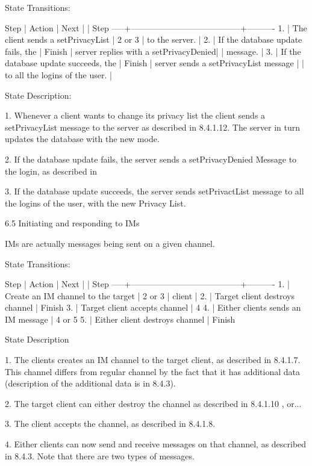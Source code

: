 \documentclass[titlepage,oneside]{book}
\begin{document}
State Transitions:

Step | Action                                |  Next
     |                                       |  Step
-----+---------------------------------------+----------
1.   | The client sends a setPrivacyList     | 2 or 3
     | to the server.                        |
2.   | If the database update fails, the     | Finish
     | server replies with a setPrivacyDenied|
     | message.                              |
3.   | If the database update succeeds, the  | Finish
     | server sends a setPrivacyList message |
     | to all the logins of the user.        |

State Description:

1. Whenever a client wants to change its privacy list the client sends
a setPrivacyList message to the server as described in
8.4.1.12. The server in turn updates the database with the
new mode.

2. If the database update fails, the server sends a setPrivacyDenied
Message to the login, as described in 

3. If the database update succeeds, the server sends setPrivactList
message to all the logins of the user, with the new Privacy List.

6.5 Initiating and responding to IMs

IMs are actually messages being sent on a given channel.

State Transitions:

Step | Action                                |  Next
     |                                       |  Step
-----+---------------------------------------+----------
1.   | Create an IM channel to the target    |  2 or 3
     | client                                |
2.   | Target client destroys channel        |  Finish
3.   | Target client accepts channel         |  4
4.   | Either clients sends an IM message    |  4 or 5
5.   | Either client destroys channel        |  Finish


State Description

1. The clients creates an IM channel to the target client, as described
in 8.4.1.7. This channel differs from regular channel by the fact
that it has additional data (description of the additional data is in
8.4.3).

2. The target client can either destroy the channel as described in
8.4.1.10 , or...

3. The client accepts the channel, as described in 8.4.1.8.

4. Either clients can now send and receive messages on that channel, as
described in 8.4.3. Note that there are two types of messages.
\end{document}

